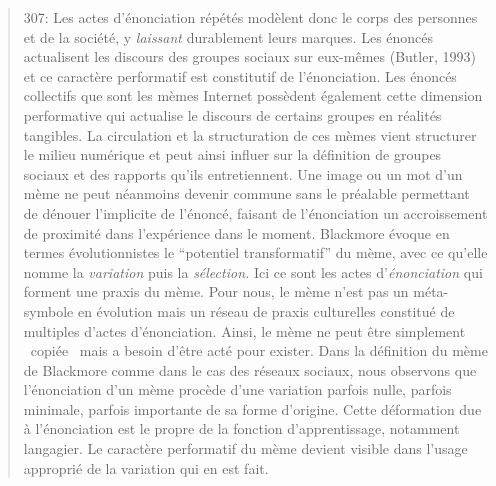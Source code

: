 \begin{quote}
307: Les actes d{\textquoteright}\'enonciation r\'ep\'et\'es mod\`elent donc le corps des personnes et de la soci\'et\'e, y \textit{laissant }durablement leurs marques. Les \'enonc\'es actualisent les discours des groupes sociaux sur eux-m\^emes (Butler, 1993) et ce caract\`ere performatif est constitutif de l{\textquoteright}\'enonciation. Les \'enonc\'es collectifs que sont les m\`emes Internet poss\`edent \'egalement cette dimension performative qui actualise le discours de certains groupes en r\'ealit\'es tangibles. La circulation et la structuration de ces m\`emes vient structurer le milieu num\'erique et peut ainsi influer sur la d\'efinition de groupes sociaux et des rapports qu{\textquoteright}ils entretiennent. Une image ou un mot d{\textquoteright}un m\`eme ne peut n\'eanmoins devenir commune sans le pr\'ealable permettant de d\'enouer l{\textquoteright}implicite de l{\textquoteright}\'enonc\'e, faisant de l{\textquoteright}\'enonciation un accroissement de proximit\'e dans l{\textquoteright}exp\'erience dans le moment. Blackmore \'evoque en termes \'evolutionnistes le {\textquotedblleft}potentiel transformatif{\textquotedblright} du m\`eme, avec ce qu{\textquoteright}elle nomme la \textit{variation} puis la \textit{s\'election. }Ici ce sont les actes d{\textquoteright}\textit{\'enonciation} qui forment une praxis du m\`eme. Pour nous, le m\`eme n{\textquoteright}est pas un m\'eta-symbole en \'evolution mais un r\'eseau de praxis culturelles constitu\'e de multiples d{\textquoteright}actes d{\textquoteright}\'enonciation. Ainsi, le m\`eme ne peut \^etre simplement {\guillemotleft}~copi\'ee~{\guillemotright} mais a besoin d{\textquoteright}\^etre act\'e pour exister. Dans la d\'efinition du m\`eme de Blackmore comme dans le cas des r\'eseaux sociaux, nous observons que l{\textquoteright}\'enonciation d{\textquoteright}un m\`eme proc\`ede d{\textquoteright}une variation parfois nulle, parfois minimale, parfois importante de sa forme d{\textquoteright}origine. Cette d\'eformation due \`a l{\textquoteright}\'enonciation est le propre de la fonction d{\textquoteright}apprentissage, notamment langagier. Le caract\`ere performatif du m\`eme devient visible dans l{\textquoteright}usage appropri\'e de la variation qui en est fait. 

\end{quote}
